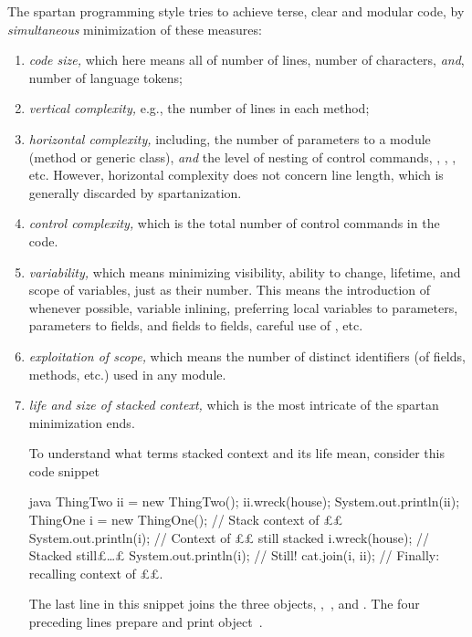 The spartan programming style tries to achieve terse, clear and modular code,
by \textit{simultaneous} minimization of these measures:
\begin{enumerate}
  \item \textit{code size,} which here means all of number of lines, number of
        characters, \emph{and}, number of language tokens;
  \item \textit{vertical complexity,} e.g., the number of lines in each
        method;
  \item \textit{horizontal complexity,} including, the number of parameters to a
        module (method or generic class), \emph{and} the level of nesting of
        control commands, , , , etc. However,
        horizontal complexity does not concern line length, which is generally
        discarded by spartanization.
  \item \textit{control complexity,} which is the total number of control
        commands in the code.
  \item \textit{variability,} which means minimizing visibility, ability to
        change, lifetime, and scope of variables, just as their number.
        This means the introduction of  whenever possible,
        variable inlining, preferring local variables to parameters, parameters
        to fields, and fields to  fields, careful use of
        , etc.
  \item \textit{exploitation of scope,} which means the number of distinct
        identifiers (of fields, methods, etc.) used in any module.
  \item \textit{life and size of stacked context,} which is the most intricate of the
        spartan minimization ends.

        To understand what terms stacked context and its life mean, consider
        this code snippet

\begin{code}[minipage,width=54ex]{java}
ThingTwo ii = new ThingTwo();
ii.wreck(house);
System.out.println(ii);
ThingOne i = new ThingOne(); // Stack context of ££
System.out.println(i); // Context of ££ still stacked
i.wreck(house); // Stacked still£…£
System.out.println(i); // Still!
cat.join(i, ii); // Finally: recalling context of ££.
  \end{code}
  The last line in this snippet joins the three objects,
  ,~, and . The four preceding lines prepare
  and print object~.


\end{enumerate}
